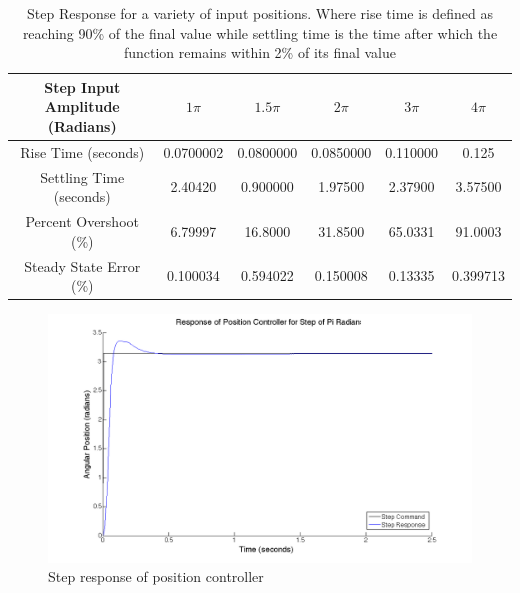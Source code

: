 \documentclass{article}
\theoremstyle{plain}
\theoremstyle{definition}
\theoremstyle{remark}
\begin{document}
\begin{table}
\begin{center}
    \begin{tabular}{|c|c|c|c|c|c|}
        \hline
        Step Input Amplitude (Radians) & $1\pi$   & $1.5 \pi$ & $2\pi$   & $3\pi$   & $4\pi$   \\ \hline
        Rise Time (seconds)            & 0.0700002 & 0.0800000   & 0.0850000 & 0.110000 & 0.125    \\ 
        Settling Time (seconds)        & 2.40420   & 0.900000    & 1.97500   & 2.37900  & 3.57500  \\ 
        Percent Overshoot (\%)          & 6.79997   & 16.8000     & 31.8500   & 65.0331  & 91.0003  \\ 
        Steady State Error (\%)         & 0.100034  & 0.594022    & 0.150008  & 0.13335  & 0.399713 \\
        \hline
    \end{tabular}
\end{center}
\caption{Step Response for a variety of input positions.  Where rise time is defined as reaching 90\% of the final value while settling time is the time after which the function remains within 2\% of its final value}
\label{q5_b6}
\end{table}

\begin{figure}
\begin{center}
\includegraphics[width = 14cm]{posstep_1pi.png}
\caption{Step response of position controller}
\label{q5_b1}
\end{center}
\end{figure}
\end{document}
